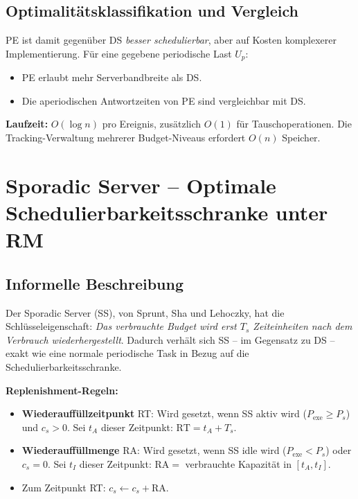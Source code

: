 ﻿\documentclass[a4paper,12pt]{report}
\theoremstyle{definition}
\begin{document}
\subsection{Optimalitätsklassifikation und Vergleich}

PE ist damit gegenüber DS \emph{besser schedulierbar}, aber auf Kosten
komplexerer Implementierung. Für eine gegebene periodische Last $U_p$:
\begin{itemize}
	\item PE erlaubt mehr Serverbandbreite als DS.
	\item Die aperiodischen Antwortzeiten von PE sind vergleichbar mit DS.
\end{itemize}

\textbf{Laufzeit:} $O(\log n)$ pro Ereignis, zusätzlich $O(1)$ für Tauschoperationen.
Die Tracking-Verwaltung mehrerer Budget-Niveaus erfordert $O(n)$ Speicher.

\section{Sporadic Server -- Optimale Schedulierbarkeitsschranke unter RM}

\subsection{Informelle Beschreibung}

Der Sporadic Server (SS), von Sprunt, Sha und Lehoczky, hat die Schlüsseleigenschaft:
\emph{Das verbrauchte Budget wird erst $T_s$ Zeiteinheiten nach dem Verbrauch
wiederhergestellt}. Dadurch verhält sich SS -- im Gegensatz zu DS -- exakt wie
eine normale periodische Task in Bezug auf die Schedulierbarkeitsschranke.

\textbf{Replenishment-Regeln:}
\begin{itemize}
	\item \textbf{Wiederauffüllzeitpunkt} RT: Wird gesetzt, wenn SS aktiv wird
	      ($P_{\text{exe}} \geq P_s$) und $c_s > 0$. Sei $t_A$ dieser Zeitpunkt:
	      $\mathrm{RT} = t_A + T_s$.
	\item \textbf{Wiederauffüllmenge} RA: Wird gesetzt, wenn SS idle wird ($P_{\text{exe}} < P_s$)
	      oder $c_s = 0$. Sei $t_I$ dieser Zeitpunkt:
	      $\mathrm{RA} = $ verbrauchte Kapazität in $[t_A, t_I]$.
	\item Zum Zeitpunkt RT: $c_s \leftarrow c_s + \mathrm{RA}$.
\end{itemize}
\end{document}
